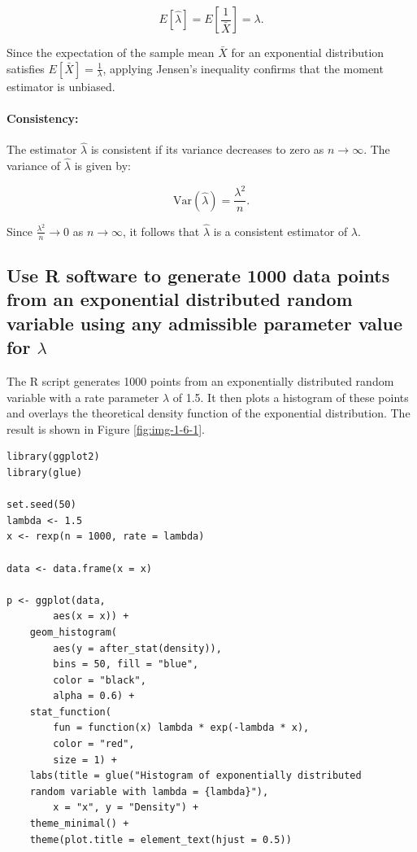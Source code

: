 \documentclass[]{article}
\begin{document}
\begin{equation}
	E[\hat{\lambda}] = E\left[\frac{1}{\bar{X}}\right] = \lambda.
\end{equation}

Since the expectation of the sample mean \( \bar{X} \) for an exponential distribution satisfies \( E[\bar{X}] = \frac{1}{\lambda} \), applying Jensen's inequality confirms that the moment estimator is unbiased.

\paragraph{Consistency:} The estimator \( \hat{\lambda} \) is consistent if its variance decreases to zero as \( n \to \infty \). The variance of \( \hat{\lambda} \) is given by:

\begin{equation}
	\text{Var}(\hat{\lambda}) = \frac{\lambda^2}{n}.
\end{equation}

Since \( \frac{\lambda^2}{n} \to 0 \) as \( n \to \infty \), it follows that \( \hat{\lambda} \) is a consistent estimator of \( \lambda \).

	

\subsection{Use R software to generate 1000 data points from an exponential distributed random variable using
	any admissible parameter value for $\lambda$}

The R script generates 1000 points from an exponentially distributed random variable with a rate parameter $\lambda$ of 1.5. It then plots a histogram of these points and overlays the theoretical density function of the exponential distribution. The result is shown in Figure \ref{fig:img-1-6-1}.


\begin{lstlisting}
library(ggplot2)
library(glue)

set.seed(50)
lambda <- 1.5
x <- rexp(n = 1000, rate = lambda)

data <- data.frame(x = x)

p <- ggplot(data,
		aes(x = x)) +
	geom_histogram(
		aes(y = after_stat(density)),
		bins = 50, fill = "blue",
		color = "black",
		alpha = 0.6) +
	stat_function(
		fun = function(x) lambda * exp(-lambda * x),
		color = "red",
		size = 1) +
	labs(title = glue("Histogram of exponentially distributed 
	random variable with lambda = {lambda}"),
		x = "x", y = "Density") +
	theme_minimal() +
	theme(plot.title = element_text(hjust = 0.5))
\end{lstlisting}
\end{document}
